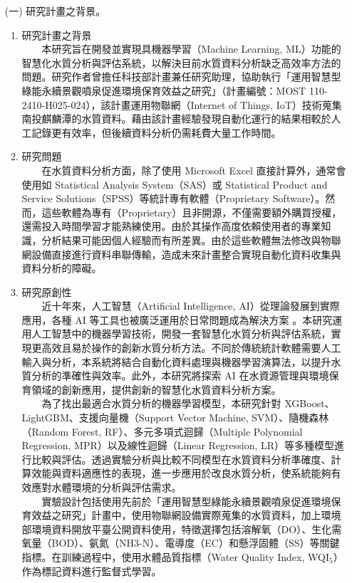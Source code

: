 \documentclass[12pt,a4paper]{article}
\begin{document}

\begin{enumerate}
\item[(一)] 研究計畫之背景。
\begin{enumerate}[label=\arabic*.]
\item 研究計畫之背景\\
　　本研究旨在開發並實現具機器學習（Machine Learning, ML）功能的智慧化水質分析與評估系統，以解決目前水質資料分析缺乏高效率方法的問題。研究作者曾擔任科技部計畫兼任研究助理，協助執行「運用智慧型綠能永續景觀噴泉促進環境保育效益之研究」（計畫編號：MOST 110-2410-H025-024），該計畫運用物聯網（Internet of Things, IoT）技術蒐集南投麒麟潭的水質資料。藉由該計畫經驗發現自動化運行的結果相較於人工記錄更有效率，但後續資料分析仍需耗費大量工作時間。
\item 研究問題\\
　　在水質資料分析方面，除了使用 Microsoft Excel 直接計算外，通常會使用如 Statistical Analysis System（SAS）或 Statistical Product and Service Solutions（SPSS）等統計專有軟體（Proprietary Software）。然而，這些軟體為專有（Proprietary）且非開源，不僅需要額外購買授權，還需投入時間學習才能熟練使用。由於其操作高度依賴使用者的專業知識，分析結果可能因個人經驗而有所差異。由於這些軟體無法修改與物聯網設備直接進行資料串聯傳輸，造成未來計畫整合實現自動化資料收集與資料分析的障礙。
\item 研究原創性\\
　　近十年來，人工智慧（Artificial Intelligence, AI）從理論發展到實際應用，各種 AI 等工具也被廣泛運用於日常問題成為解決方案 \cite{ref1}。本研究運用人工智慧中的機器學習技術，開發一套智慧化水質分析與評估系統，實現更高效且易於操作的創新水質分析方法。不同於傳統統計軟體需要人工輸入與分析，本系統將結合自動化資料處理與機器學習演算法，以提升水質分析的準確性與效率。此外，本研究將探索 AI 在水資源管理與環境保育領域的創新應用，提供創新的智慧化水質資料分析方案。\\
　　為了找出最適合水質分析的機器學習模型，本研究針對 XGBoost、LightGBM、支援向量機（Support Vector Machine, SVM）、隨機森林（Random Forest, RF）、多元多項式迴歸（Multiple Polynomial Regression, MPR）以及線性迴歸（Linear Regression, LR）等多種模型進行比較與評估。透過實驗分析與比較不同模型在水質資料分析準確度、計算效能與資料適應性的表現，進一步應用於改良水質分析，使系統能夠有效應對水體環境的分析與評估需求。\\
　　實驗設計包括使用先前於「運用智慧型綠能永續景觀噴泉促進環境保育效益之研究」計畫中，使用物聯網設備實際蒐集的水質資料，加上環境部環境資料開放平臺公開資料使用，特徵選擇包括溶解氧（DO）、生化需氧量（BOD）、氨氮（NH3-N）、電導度（EC）和懸浮固體（SS）等關鍵指標。在訓練過程中，使用水體品質指標（Water Quality Index, WQI$_5$）作為標記資料進行監督式學習。

\end{enumerate}
\end{enumerate}
\end{document}

